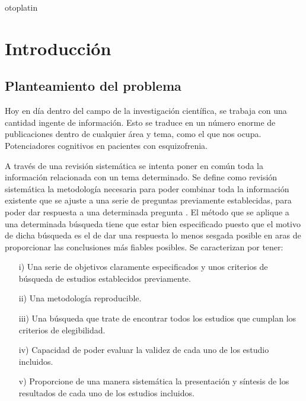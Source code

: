 otoplatin\documentclass[a4paper,openright,12pt]{report}
\begin{document}
\pagestyle{myheadings}
\chapter{Introducción}\label{cap.introduccion}
\section{Planteamiento del problema}
Hoy en día dentro del campo de la investigación científica, se trabaja con una cantidad ingente de información. Esto se traduce en un número enorme de publicaciones dentro de cualquier área y tema, como el que nos ocupa. Potenciadores cognitivos en pacientes con esquizofrenia.

A través de una revisión sistemática se intenta poner en común toda la información relacionada con un tema determinado. Se define como revisión sistemática la metodología necesaria para poder combinar toda la información existente que se ajuste a una serie de preguntas previamente establecidas, para poder dar respuesta a una determinada pregunta \cite{Cochrane_man}. El método que se aplique a una determinada búsqueda tiene que estar bien especificado puesto que el motivo de dicha búsqueda es el de dar una respuesta lo menos sesgada posible en aras de proporcionar las conclusiones más fiables posibles. Se caracterizan por tener:
\begin{itemize}
\item[i)] Una serie de objetivos claramente especificados y unos criterios de búsqueda de estudios establecidos previamente.
\item[ii)] Una metodología reproducible.
\item[iii)]Una búsqueda que trate de encontrar todos los estudios que cumplan los criterios de elegibilidad.
\item[iv)] Capacidad de poder evaluar la validez de cada uno de los estudio incluidos.
\item[v)] Proporcione de una manera sistemática la presentación y síntesis de los resultados de cada uno de los estudios incluidos.
\end{itemize}
\end{document}
